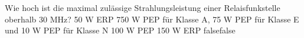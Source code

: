     {Wie hoch ist die maximal zulässige Strahlungsleistung einer Relaisfunkstelle oberhalb 30 MHz?}
    {50 W ERP}
    {750 W PEP für Klasse A, 75 W PEP für Klasse E und 10 W PEP für Klasse N}
    {100 W PEP}
    {150 W ERP}
    {false}{false}